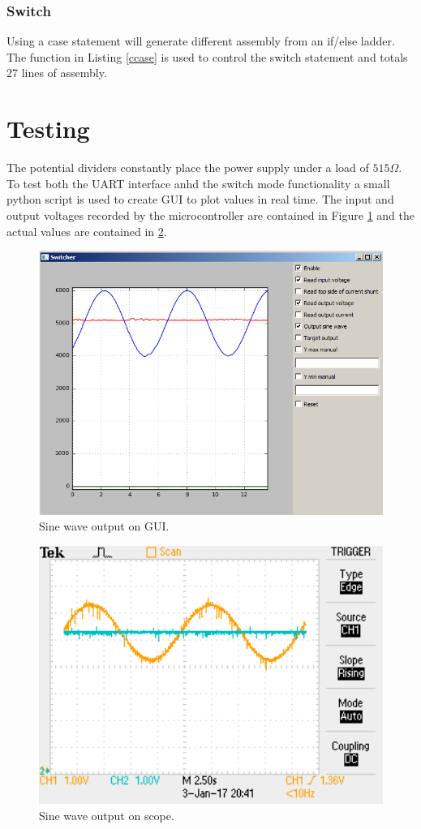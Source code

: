 \documentclass[12pt]{article}%
\begin{document}
\subsubsection{Switch}

Using a case statement will generate different assembly from an if/else ladder. The function in Listing \ref{ccase} is used to control the switch statement and totals 27 lines of assembly.


\section{Testing}

The potential dividers constantly place the power supply under a load of $515\Omega$. To test both the UART interface anhd the switch mode functionality a small python script is used to create GUI to plot values in real time. The input and output voltages recorded by the microcontroller are contained in Figure \ref{fig:gui} and the actual values are contained in \ref{fig:scope}.

\begin{figure}[H]
	\centering
  	\includegraphics[width=12cm]{gui.png}
  	\caption{Sine wave output on GUI.}
  	\label{fig:gui}
\end{figure}

\begin{figure}[H]
	\centering
  	\includegraphics[width=12cm]{scope.png}
  	\caption{Sine wave output on scope.}
  	\label{fig:scope}
\end{figure}
\end{document}
